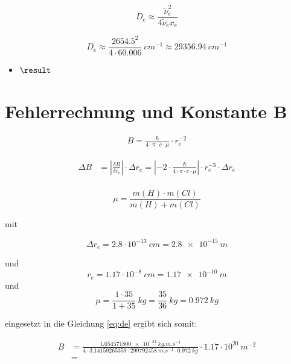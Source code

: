 \begin{equation} 
	\label{eq:de}
		D_e \approx \frac{\tilde{\nu}_e^2}{4 \tilde{\nu}_e x_e}
\end{equation}

\begin{equation} 
	\label{eq:de}
		D_e \approx \frac{2654.5^2}{4\cdot60.006} ~\si
{cm^{-1}}  \approx  \SI[mode=math]{29356.94}{cm^{-1}} 
\end{equation}

\begin{itemize}
 \item {}%
    $\result$
\end{itemize} 
\section{Fehlerrechnung und Konstante B}
\begin{align}
		B 	
   			= \frac{\hbar}{4 \cdot \pi \cdot c \cdot \mu  }\cdot r_e^{-2}
\end{align}

		


\begin{align}
		\Delta B	
   			&=  \left|\frac{\delta B}{\delta r_e}\right|\cdot\Delta r_e =\left|-2\cdot\frac{\hbar}{4 \cdot \pi \cdot c \cdot \mu  }\right|\cdot r_e^{-3} \cdot \Delta r_e
\end{align}
\\


\begin{equation}
\mu= \frac{m(H)\cdot m(Cl)}{m(H)+m(Cl)}
\end{equation}		

mit 

\begin{equation}
\Delta r_e = 2.8 \cdot 10^{-13} ~\si{cm}=\SI[mode=math]{2.8e-15}{m}
\end{equation}


und
\begin{equation}
 r_e = 1.17 \cdot 10^{-8} ~\si{cm}=\SI[mode=math]{1.17e-10}{m}
\end{equation}
und 
\begin{equation}
\mu= \frac{1\cdot35}{1+35} ~\si{kg}=\frac{35}{36}~\si{kg}=\SI[mode=math]{0.972}{kg}
\end{equation}
 
eingesetzt in die Gleichung \ref{eq:de} ergibt sich somit:

\begin{align}
B &= \frac{\SI[mode=math]{1.054571800e-34}{kg.m.s^{-1}}}{4\cdot 3.14159265359 \cdot \SI[mode=math]{299792458}{m.s^{-1}} \cdot \SI[mode=math]{0.972}{kg} }\cdot 1.17 \cdot 10^{20} ~\si{m^{-2}}
\\
&=
\end{align}



